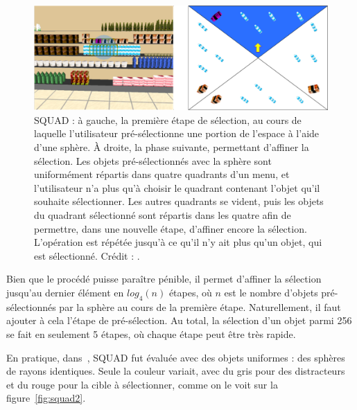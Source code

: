 	\begin{figure}[!htb]
		\centering
		\includegraphics[width=\textwidth]{figures/ch2/squad}
		\caption[Fonctionnement de la technique SQUAD]{SQUAD : à gauche, la première étape de sélection, au cours de laquelle l'utilisateur pré-sélectionne une portion de l'espace à l'aide d'une sphère. À droite, la phase suivante, permettant d'affiner la sélection. Les objets pré-sélectionnés avec la sphère sont uniformément répartis dans quatre quadrants d'un menu, et l'utilisateur n'a plus qu'à choisir le quadrant contenant l'objet qu'il souhaite sélectionner. Les autres quadrants se vident, puis les objets du quadrant sélectionné sont répartis dans les quatre afin de permettre, dans une nouvelle étape, d'affiner encore la sélection. L'opération est répétée jusqu'à ce qu'il n'y ait plus qu'un objet, qui est sélectionné. Crédit : \cite{kopper2011rapid}.}
		\label{fig:squad}
	\end{figure}
	
	Bien que le procédé puisse paraître pénible, il permet d'affiner la sélection jusqu'au dernier élément en $log_{4}(n)$ étapes, où $n$ est le nombre d'objets pré-sélectionnés par la sphère au cours de la première étape. Naturellement, il faut ajouter à cela l'étape de pré-sélection. Au total, la sélection d'un objet parmi 256 se fait en seulement 5 étapes, où chaque étape peut être très rapide.
	
	En pratique, dans~\cite{kopper2011rapid}, SQUAD fut évaluée avec des objets uniformes : des sphères de rayons identiques. Seule la couleur variait, avec du gris pour des distracteurs et du rouge pour la cible à sélectionner, comme on le voit sur la figure~\ref{fig:squad2}. 
	
